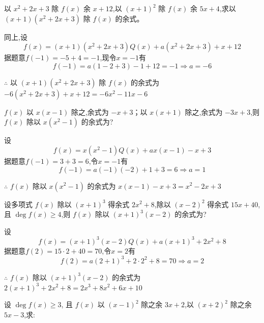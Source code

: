 \begin{questions}
    \question 以 $x^2 + 2x + 3$ 除 $f(x)$ 余 $x + 12$,以 $(x+1)^2$ 除 $f(x)$ 余 $5x + 4$,求以 $(x+1)(x^2 + 2x + 3)$ 除 $f(x)$ 的余式。
    \begin{solution}
        同上,设$$f(x)=(x+1)(x^2+2x+3)Q(x)+a(x^2+2x+3)+x+12$$
        据题意$f(-1)=-5+4=-1$,现令$x=-1$有$$f(-1)=a(1-2+3)-1+12=-1 \Rightarrow a=-6$$

        $\therefore$ 以 $(x+1)(x^2 + 2x + 3)$ 除 $f(x)$ 的余式为 $-6(x^2 + 2x + 3)+x+12=-6x^2 - 11x - 6$    
    \end{solution}
    
    \question $f(x)$ 以 $x(x - 1)$ 除之,余式为 $-x + 3$；以 $x(x+1)$ 除之,余式为 $-3x + 3$,则 $f(x)$ 除以 $x(x^2 - 1)$ 的余式为?
    \begin{solution}
        设$$f(x)=x(x^2-1)Q(x)+ax(x-1)-x+3$$
        据题意$f(-1)=3+3=6$,令$x=-1$有$$f(-1)=a(-1)(-2)+1+3=6 \Rightarrow a=1$$

        $\therefore$ $f(x)$ 除以 $x(x^2 - 1)$ 的余式为 $x(x-1)-x+3=x^2 - 2x + 3$  
    \end{solution}
    
    \question 设多项式 $f(x)$ 除以 $(x+1)^3$ 得余式 $2x^2 + 8$,除以 $(x - 2)^2$ 得余式 $15x + 40$,且 $\deg f(x) \geq 4$,则 $f(x)$ 除以 $(x+1)^3 (x-2)$ 的余式为?
    \begin{solution}
        设$$f(x)=(x+1)^3 (x-2)Q(x)+a(x+1)^3+2x^2 + 8$$
        据题意$f(2)=15\cdot2+40=70$,令$x=2$有$$f(2)=a(2+1)^3+2\cdot2^2 + 8 =70\Rightarrow a=2$$

        $\therefore$ $f(x)$ 除以 $(x+1)^3 (x-2)$ 的余式为 $2(x+1)^3+2x^2 + 8=2x^3 + 8x^2 + 6x + 10$  
    \end{solution}

    
    \question 设 $\deg f(x) \geq 3$, 且 $f(x)$ 以 $(x-1)^2$ 除之余 $3x + 2$,以 $(x+2)^2$ 除之余 $5x - 3$,求:
        
\end{questions}
